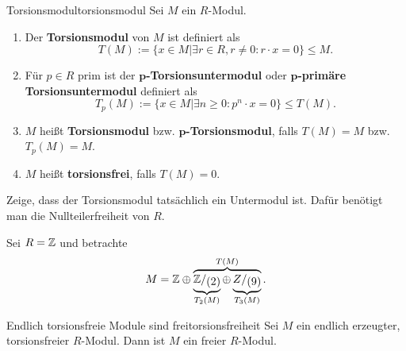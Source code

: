 \begin{definition}{Torsionsmodul}{torsionsmodul}
Sei $M$ ein $R$-Modul.
\begin{enumerate}
\item Der \textbf{Torsionsmodul} von $M$ ist definiert als
\begin{equation}
T(M) := \{x \in M | \exists r \in R, r\neq 0: r \cdot x = 0 \} \leq M.
\end{equation}
\item Für $p \in R$ prim ist der \textbf{$\mathbf{p}$-Torsionsuntermodul} oder \textbf{$\mathbf{p}$-primäre Torsionsuntermodul} definiert als
\begin{equation}
T_p(M) := \{x \in M| \exists n \geq 0: p^n \cdot x = 0\} \leq T(M).
\end{equation}
\item $M$ heißt \textbf{Torsionsmodul} bzw. \textbf{$\mathbf{p}$-Torsionsmodul}, falls $T(M)=M$ bzw. $T_p(M)=M$.
\item $M$ heißt \textbf{torsionsfrei}, falls $T(M)=0$.
\end{enumerate}
\end{definition}
\begin{übung}
Zeige, dass der Torsionsmodul tatsächlich ein Untermodul ist. Dafür benötigt man die Nullteilerfreiheit von $R$.
\end{übung}
\begin{beispiel}
Sei $R=\mathbb{Z}$ und betrachte 
\begin{equation}
M = \Z \oplus \overbrace{\underbrace{\quotient{\Z}{(2)}}_{T_2(M)} \oplus \underbrace{\quotient{Z}{(9)}}_{T_3(M)}}^{T(M)}.
\end{equation}
\end{beispiel}
\begin{lemma}{Endlich torsionsfreie Module sind frei}{torsionsfreiheit}
Sei $M$ ein endlich erzeugter, torsionsfreier $R$-Modul. Dann ist $M$ ein freier $R$-Modul.
\end{lemma}
